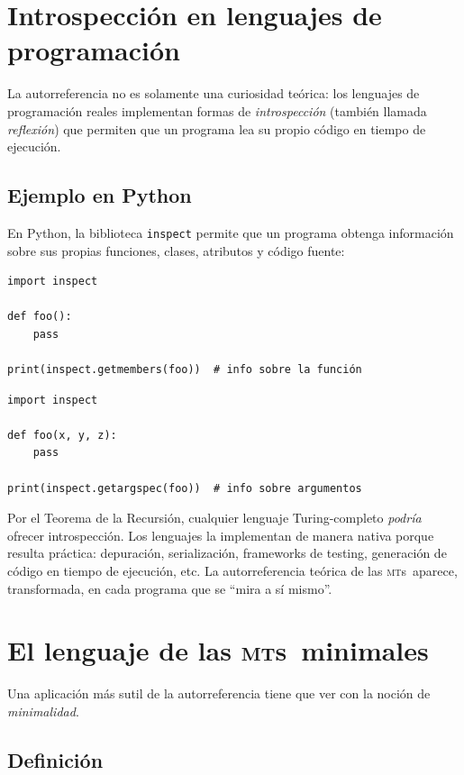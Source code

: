 \documentclass[11pt,a4paper]{article}
\theoremstyle{definicion}
\newcommand{\MTs}{\textsc{mt}s}
\begin{document}
\section{Introspección en lenguajes de programación}

La autorreferencia no es solamente una curiosidad teórica: los lenguajes de programación reales implementan formas de \emph{introspección} (también llamada \emph{reflexión}) que permiten que un programa lea su propio código en tiempo de ejecución.

\subsection{Ejemplo en Python}

En Python, la biblioteca \texttt{inspect} permite que un programa obtenga información sobre sus propias funciones, clases, atributos y código fuente:

\begin{lstlisting}
import inspect

def foo():
    pass

print(inspect.getmembers(foo))  # info sobre la función
\end{lstlisting}

\begin{lstlisting}
import inspect

def foo(x, y, z):
    pass

print(inspect.getargspec(foo))  # info sobre argumentos
\end{lstlisting}

\begin{intuicion}
Por el Teorema de la Recursión, cualquier lenguaje Turing-completo \emph{podría} ofrecer introspección. Los lenguajes la implementan de manera nativa porque resulta práctica: depuración, serialización, frameworks de testing, generación de código en tiempo de ejecución, etc. La autorreferencia teórica de las \MTs\ aparece, transformada, en cada programa que se ``mira a sí mismo''.
\end{intuicion}

\section{El lenguaje de las \MTs\ minimales}

Una aplicación más sutil de la autorreferencia tiene que ver con la noción de \emph{minimalidad}.

\subsection{Definición}
\end{document}
